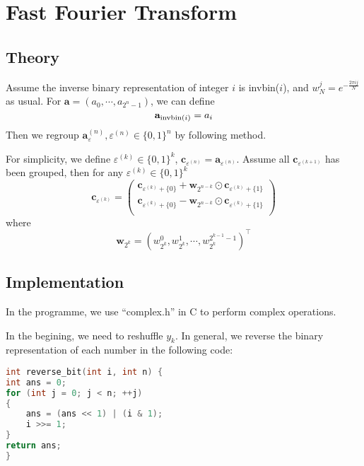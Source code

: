 \documentclass[conference,onecolumn,12pt]{IEEEtran}
\renewcommand{\a}{\mathbf{a}}
\renewcommand{\c}{\mathbf{c}}
\theoremstyle{definition}
\begin{document}
\section{Fast Fourier Transform}
\subsection{Theory}
Assume the inverse binary representation of integer $i$ is invbin($i$), and $w^j_N = e^{-\frac{2\pi ij}{N}}$ as usual. For $\a = (a_0,\cdots,a_{2^n-1})$, we can define
\begin{equation}
\a_{{\rm invbin}(i)} = a_i
\end{equation}
Then we regroup $\a_\varepsilon^{(n)}, \varepsilon^{(n)} \in \{0,1\}^n$ by following method.

For simplicity, we define $\varepsilon^{(k)}\in \{0,1\}^k$, $\c_{\varepsilon^{(n)}}=\a_{\varepsilon^{(n)}}$. Assume all $\c_{\varepsilon^{(k+1)}}$ has been grouped, then for any $\varepsilon^{(k)}\in \{0,1\}^k$
\begin{equation}
    \c_{\varepsilon^{(k)}} = \left(
        \begin{matrix}
            \c_{\varepsilon^{(k)}+\{0\}} + \mathbf{w}_{2^{n-k}}\odot \c_{\varepsilon^{(k)}+\{1\}}\\
            \c_{\varepsilon^{(k)}+\{0\}} - \mathbf{w}_{2^{n-k}}\odot \c_{\varepsilon^{(k)}+\{1\}}\\
        \end{matrix}
    \right)
\end{equation}
where
\begin{equation}
    \mathbf{w}_{2^k} = (w_{2^k}^0,w_{2^k}^1,\cdots,w_{2^k}^{2^{k-1}-1})^\top
\end{equation}


\subsection{Implementation}
In the programme, we use ``complex.h'' in C to perform complex operations. 

In the begining, we need to reshuffle $y_k$. In general, we reverse the binary representation of each number in the following code:
\begin{lstlisting}[language=C]
int reverse_bit(int i, int n) {
int ans = 0;
for (int j = 0; j < n; ++j)
{
    ans = (ans << 1) | (i & 1);
    i >>= 1;
}
return ans;
}
\end{lstlisting}
\end{document}
